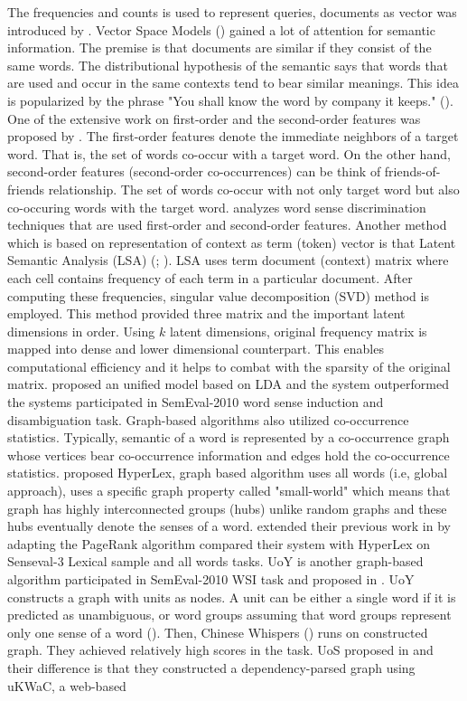 The frequencies and counts is used to represent queries, documents as vector was introduced by \cite{salton75vector}. Vector Space Models (\cite{turney10frequency}) gained a lot of attention for semantic information. The premise is that documents are similar if they consist of the same words. The distributional hypothesis of the semantic says that words that are used and occur in the same contexts tend to bear similar meanings. This idea is popularized by the phrase "You shall know the word by company it keeps." (\cite{firth57synopsis}). One of the extensive work on first-order and the second-order features was proposed by \cite{schutze98automatic}. The first-order features denote the immediate neighbors of a target word. That is, the set of words co-occur with a target word. On the other hand, second-order features (second-order co-occurrences) can be think of friends-of-friends relationship. The set of words co-occur with not only target word but also co-occuring words with the target word. \cite{purandare04discriminating} analyzes word sense discrimination techniques that are used first-order and second-order features.  Another method which is based on representation of context as term (token) vector is that Latent Semantic Analysis (LSA) (\cite{deerwester90indexing}; \cite{landauer1997solution}). LSA uses term document (context) matrix where each cell contains frequency of each term in a particular document. After computing these frequencies, singular value decomposition (SVD) method is employed. This method provided three matrix and the important latent dimensions in order. Using $k$ latent dimensions, original frequency matrix is mapped into dense and lower dimensional counterpart. This enables computational efficiency and it helps to combat with the sparsity of the original matrix. \cite{vandecruys11latent} proposed an unified model based on LDA and the system outperformed the systems participated in SemEval-2010 word sense induction and disambiguation task. Graph-based algorithms also utilized co-occurrence statistics. Typically, semantic of a word is represented by a co-occurrence graph whose vertices bear co-occurrence information and edges hold the co-occurrence statistics. \cite{veronis04hyperlex} proposed HyperLex, graph based algorithm uses all words (i.e, global approach), uses a specific graph property called "small-world" which means that graph has highly interconnected groups (hubs) unlike random graphs and these hubs eventually denote the senses of a word. \cite{agirre2006two} extended their previous work in \cite{agirre06evaluating}  by adapting the PageRank algorithm \cite{page1999pagerank} compared their system with HyperLex on Senseval-3 Lexical sample and all words tasks. UoY is another graph-based algorithm participated in SemEval-2010 WSI task and proposed in \cite{korkontzelos10uoy}. UoY constructs a graph with units as nodes. A unit can be either a single word if it is predicted as unambiguous, or word groups assuming that word groups represent only one sense of a word (\cite{klapaftis08word}). Then, Chinese Whispers (\cite{biemann06chinese}) runs on constructed graph. They achieved relatively high scores in the task. UoS proposed in \cite{hope2013uos} and their difference is that they constructed a dependency-parsed graph using uKWaC, a web-based 